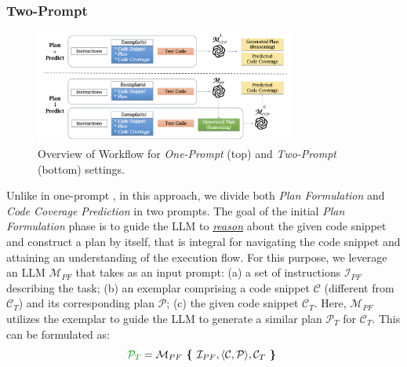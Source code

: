 %

%

\subsubsection{Two-Prompt {\cctool}}

\begin{figure} 
    \centering
    \includegraphics[width=3.4in]{codepilot-overview.png}
    \vspace{-6pt}
    \caption{Overview of {\cctool} Workflow for \textit{One-Prompt} (top) and \textit{Two-Prompt} (bottom) settings.}
    \label{fig:codepilot}
\end{figure}

Unlike in one-prompt {\cctool}, in this approach, we divide both \textit{Plan Formulation} and \textit{Code Coverage Prediction} in two prompts. The goal of the initial \textit{Plan Formulation} phase is to guide the LLM to \underline{\textit{reason}} about the given code snippet and construct a plan by itself, that is integral for navigating the code snippet and attaining an understanding of the execution flow. For this purpose, we leverage an LLM $\mathcal{M}_{PF}$ that takes as an input prompt: (a) a set of instructions $\mathcal{I}_{PF}$ describing the task; (b) an exemplar comprising a code snippet $\mathcal{C}$ (different from $\mathcal{C}_T$) and its corresponding plan $\mathcal{P}$; (c) the given code snippet $\mathcal{C}_T$. 
Here, $\mathcal{M}_{PF}$ utilizes the exemplar to guide the LLM to generate a similar plan $\mathcal{P}_T$ for $\mathcal{C}_T$.
This can be formulated as:
\begin{equation}\label{form:f1}
\textcolor{dkgreen}{\mathcal{P}_T} = \mathcal{M}_{PF} \textbf{\ \{\ } \mathcal{I}_{PF}, \langle \mathcal{C}, \mathcal{P} \rangle, \mathcal{C}_T \textbf{\ \}\ }  
\end{equation}

